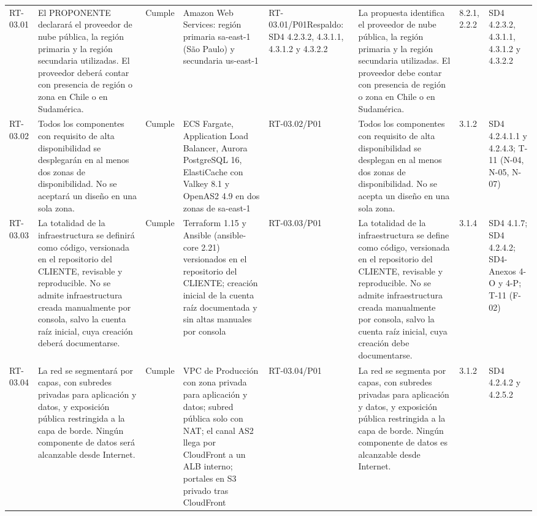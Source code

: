 \documentclass[oficio,firma,final]{lafrox}
\begin{document}
\begin{landscape}
{\begin{longtable}{@{}F{0.054} F{0.173} F{0.061} F{0.191} F{0.106} F{0.180} F{0.067} F{0.168}@{}}
  RT-03.01 & El PROPONENTE declarará el proveedor de nube pública, la región primaria y la región secundaria utilizadas. El proveedor deberá contar con presencia de región o zona en Chile o en Sudamérica. & Cumple & Amazon Web Services: región primaria sa-east-1 (São Paulo) y secundaria us-east-1 & RT-03.01/\allowbreak{}P01\newline Respaldo: SD4 4.2.3.2, 4.3.1.1, 4.3.1.2 y 4.3.2.2 & La propuesta identifica el proveedor de nube pública, la región primaria y la región secundaria utilizadas. El proveedor debe contar con presencia de región o zona en Chile o en Sudamérica. & 8.2.1, 2.2.2 & SD4 4.2.3.2, 4.3.1.1, 4.3.1.2 y 4.3.2.2  \\
  RT-03.02 & Todos los componentes con requisito de alta disponibilidad se desplegarán en al menos dos zonas de disponibilidad. No se aceptará un diseño en una sola zona. & Cumple & ECS Fargate, Application Load Balancer, Aurora PostgreSQL 16, ElastiCache con Valkey 8.1 y OpenAS2 4.9 en dos zonas de sa-east-1 & RT-03.02/\allowbreak{}P01 & Todos los componentes con requisito de alta disponibilidad se desplegan en al menos dos zonas de disponibilidad. No se acepta un diseño en una sola zona. & 3.1.2 & SD4 4.2.4.1.1 y 4.2.4.3; T-11 (N-04, N-05, N-07)  \\
  RT-03.03 & La totalidad de la infraestructura se definirá como código, versionada en el repositorio del CLIENTE, revisable y reproducible. No se admite infraestructura creada manualmente por consola, salvo la cuenta raíz inicial, cuya creación deberá documentarse. & Cumple & Terraform 1.15 y Ansible (ansible-core 2.21) versionados en el repositorio del CLIENTE; creación inicial de la cuenta raíz documentada y sin altas manuales por consola & RT-03.03/\allowbreak{}P01 & La totalidad de la infraestructura se define como código, versionada en el repositorio del CLIENTE, revisable y reproducible. No se admite infraestructura creada manualmente por consola, salvo la cuenta raíz inicial, cuya creación debe documentarse. & 3.1.4 & SD4 4.1.7; SD4 4.2.4.2; SD4-Anexos 4-O y 4-P; T-11 (F-02)  \\
  RT-03.04 & La red se segmentará por capas, con subredes privadas para aplicación y datos, y exposición pública restringida a la capa de borde. Ningún componente de datos será alcanzable desde Internet. & Cumple & VPC de Producción con zona privada para aplicación y datos; subred pública solo con NAT; el canal AS2 llega por CloudFront a un ALB interno; portales en S3 privado tras CloudFront & RT-03.04/\allowbreak{}P01 & La red se segmenta por capas, con subredes privadas para aplicación y datos, y exposición pública restringida a la capa de borde. Ningún componente de datos es alcanzable desde Internet. & 3.1.2 & SD4 4.2.4.2 y 4.2.5.2  \\

\end{longtable}}
\end{landscape}
\end{document}
